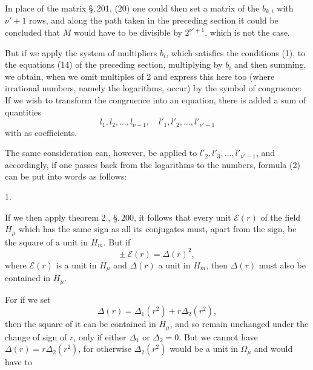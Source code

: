 In place of the matrix \S.\,201, (20) one could then set a matrix of
the $b_{k,i}$ with $\nu'+1$ rows, and along the path taken in the
preceding section it could be concluded that $M$ would have to be
divisible by $2^{\nu'+1}$, which is not the case.

But if we apply the system of multipliers $b_i$, which satisfies the
conditions (1), to the equations (14) of the preceding section,
multiplying by $b_i$ and then summing, we obtain, when we omit
multiples of 2 and express this here too (where irrational numbers,
namely the logarithms, occur) by the symbol of congruence:
If we wish to transform the congruence into an equation, there is
added a sum of quantities
\[ l_1, l_2, \ldots, l_{\nu-1}, \quad l'_1, l'_2, \ldots, l'_{\nu'-1} \]
with  as coefficients.

The same consideration can, however, be applied to $l'_2, l'_3,
\ldots, l'_{\nu'-1}$, and accordingly, if one passes back from the
logarithms to the numbers, formula (2) can be put into words as
follows:

1. 

If we then apply theorem 2., \S.\,200, it follows that every unit
$\mathcal{E}(r)$ of the field $H_\mu$ which has the same sign as all
its conjugates must, apart from the sign, be the square of a unit in
$H_m$. But if
\[ \pm\, \mathcal{E}(r) = \Delta(r)^2, \]
where $\mathcal{E}(r)$ is a unit in $H_\mu$ and $\Delta(r)$ a unit in
$H_m$, then $\Delta(r)$ must also be contained in $H_\mu$.

For if we set
\[ \Delta(r) = \Delta_1(r^2) + r \Delta_2(r^2), \]
then the square of it can be contained in $H_\mu$, and so remain
unchanged under the change of sign of $r$, only if either $\Delta_1$
or $\Delta_2 = 0$. But we cannot have $\Delta(r) = r \Delta_2(r^2)$,
for otherwise $\Delta_2(r^2)$ would be a unit in $\Omega_\mu$ and
would have to
